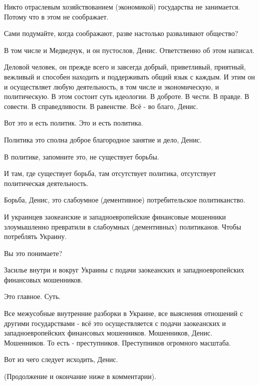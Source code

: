 \begin{itemize}
Никто отраслевым хозяйствованием (экономикой) государства не занимается. Потому
что в этом не соображает.

Сами подумайте, когда соображают, разве настолько разваливают общество?

В том числе и Медведчук, и он пустослов, Денис. Ответственно об этом написал.

Деловой человек, он прежде всего и завсегда добрый, приветливый, приятный,
вежливый и способен находить и поддерживать общий язык с каждым. И этим он и
осуществляет любую деятельность, в том числе и экономическую, и политическую. В
этом состоит суть идеологии. В доброте. В чести. В правде. В совести. В
справедливости. В равенстве. Всё - во благо, Денис.

Вот это и есть политик. Это и есть политика.

Политика это сполна доброе благородное занятие и дело, Денис.

В политике, запомните это, не существует борьбы.

И там, где существует борьба, там отсутствует политика, отсутствует
политическая деятельность.

Борьба, Денис, это слабоумное (дементивное) потребительское политиканство.

И украинцев заокеанские и западноевропейские финансовые мошенники злоумышленно
превратили в слабоумных (дементивных) политиканов. Чтобы потреблять Украину.

Вы это понимаете?

Засилье внутри и вокруг Украины с подачи заокеанских и западноевропейских
финансовых мошенников.

Это главное. Суть.

Все межусобные внутренние разборки в Украине, все выяснения отношений с другими
государствами - всё это осуществляется с подачи заокеанских и
западноевропейских финансовых мошенников. Мошенников, Денис. Мошенников. То
есть - преступников. Преступников огромного масштаба.

Вот из чего следует исходить, Денис.

(Продолжение и окончание ниже в комментарии).
\end{itemize} %
